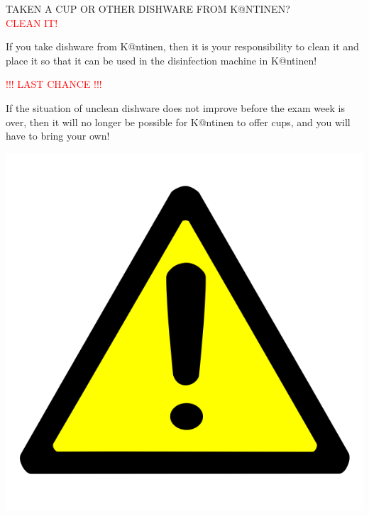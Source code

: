 \documentclass[a4paper]{article}
\begin{document}
  \maketitle
  \begin{center}
  \Huge TAKEN A CUP OR OTHER DISHWARE FROM K@NTINEN?\\\textcolor{red}{CLEAN IT!}


  \LARGE If you take dishware from K@ntinen, then it is your responsibility to clean it and place it so that it can be used in the disinfection machine in K@ntinen!
  \end{center}


  \begin{center}
    \Huge \textcolor{red}{!!! LAST CHANCE !!!}


    \LARGE If the situation of unclean dishware does not improve before the exam week is over, then it will no longer be possible for K@ntinen to offer cups, and you will have to bring your own!
  \end{center}
  \centering\includegraphics[scale=0.3]{../billeder/attention.png}
  \underskriv
\end{document}
